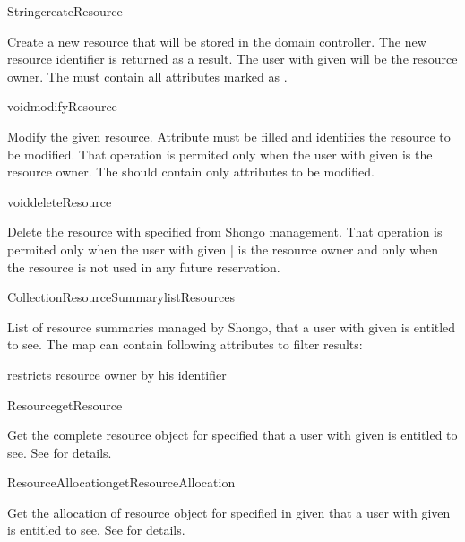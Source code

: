 \begin{Api}

\begin{ApiCmd}{String}{createResource}%
%
%
\end{ApiCmd}
Create a new resource that will be stored in the domain controller. The new resource identifier is returned as a result. The user with given  will be the resource owner. The  must contain all attributes marked as \ApiRequired.

\begin{ApiCmd}{void}{modifyResource}%
%
%
\end{ApiCmd}
Modify the given resource. Attribute  must be filled and identifies the resource to be modified. That operation is permited only when the user with given  is the resource owner. The  should contain only attributes to be modified.

\begin{ApiCmd}{void}{deleteResource}%
%
%
\end{ApiCmd}
Delete the resource with specified  from Shongo management. That operation is permited only when the user with given | is the resource owner and only when the resource is not used in any future reservation.

\begin{ApiCmdCollection}{Collection}{ResourceSummary}{listResources}%
%
%
\end{ApiCmdCollection}
List of resource summaries managed by Shongo, that a user with given  is entitled to see.
The  map can contain following attributes to filter results:
\begin{compactitem}
\item {} restricts resource owner by his identifier
\end{compactitem}

\begin{ApiCmd}{Resource}{getResource}%
%
%
\end{ApiCmd}
Get the complete resource object for specified  that a user with given  is entitled to see. See  for details.

\begin{ApiCmd}{ResourceAllocation}{getResourceAllocation}%
%
%
%
\end{ApiCmd}
Get the allocation of resource object for specified  in given  that a user with given  is entitled to see. See  for details.

\end{Api}


